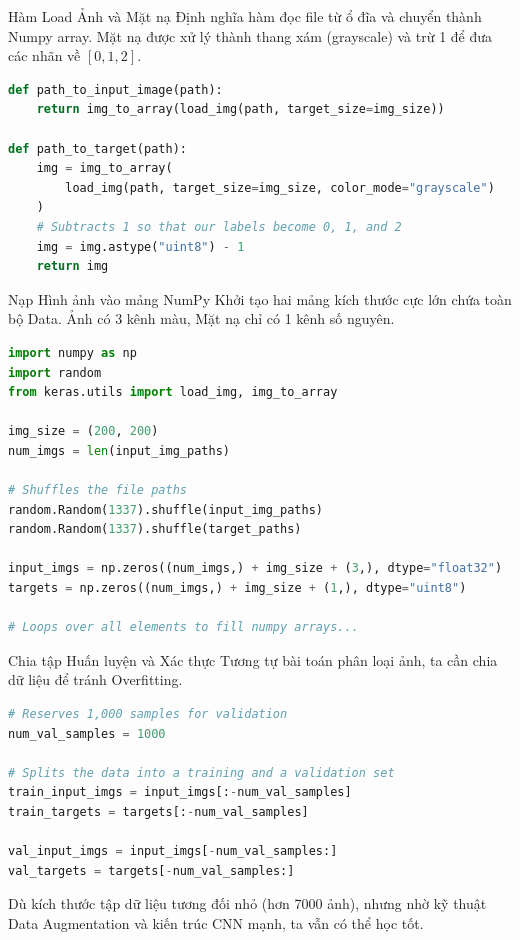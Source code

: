 \documentclass[aspectratio=169]{beamer}
\begin{document}
\begin{frame}[fragile]{Hàm Load Ảnh và Mặt nạ}
Định nghĩa hàm đọc file từ ổ đĩa và chuyển thành Numpy array. Mặt nạ được xử lý thành thang xám (grayscale) và trừ 1 để đưa các nhãn về $[0, 1, 2]$.

\begin{lstlisting}[language=Python]
def path_to_input_image(path):
    return img_to_array(load_img(path, target_size=img_size))

def path_to_target(path):
    img = img_to_array(
        load_img(path, target_size=img_size, color_mode="grayscale")
    )
    # Subtracts 1 so that our labels become 0, 1, and 2
    img = img.astype("uint8") - 1
    return img
\end{lstlisting}
\end{frame}

\begin{frame}[fragile]{Nạp Hình ảnh vào mảng NumPy}
Khởi tạo hai mảng kích thước cực lớn chứa toàn bộ Data. Ảnh có 3 kênh màu, Mặt nạ chỉ có 1 kênh số nguyên.

\begin{lstlisting}[language=Python]
import numpy as np
import random
from keras.utils import load_img, img_to_array

img_size = (200, 200)
num_imgs = len(input_img_paths)

# Shuffles the file paths
random.Random(1337).shuffle(input_img_paths)
random.Random(1337).shuffle(target_paths)

input_imgs = np.zeros((num_imgs,) + img_size + (3,), dtype="float32")
targets = np.zeros((num_imgs,) + img_size + (1,), dtype="uint8")

# Loops over all elements to fill numpy arrays...
\end{lstlisting}
\end{frame}

\begin{frame}[fragile]{Chia tập Huấn luyện và Xác thực}
Tương tự bài toán phân loại ảnh, ta cần chia dữ liệu để tránh Overfitting.

\begin{lstlisting}[language=Python]
# Reserves 1,000 samples for validation
num_val_samples = 1000

# Splits the data into a training and a validation set
train_input_imgs = input_imgs[:-num_val_samples]
train_targets = targets[:-num_val_samples]

val_input_imgs = input_imgs[-num_val_samples:]
val_targets = targets[-num_val_samples:]
\end{lstlisting}
Dù kích thước tập dữ liệu tương đối nhỏ (hơn 7000 ảnh), nhưng nhờ kỹ thuật Data Augmentation và kiến trúc CNN mạnh, ta vẫn có thể học tốt.
\end{frame}
\end{document}
